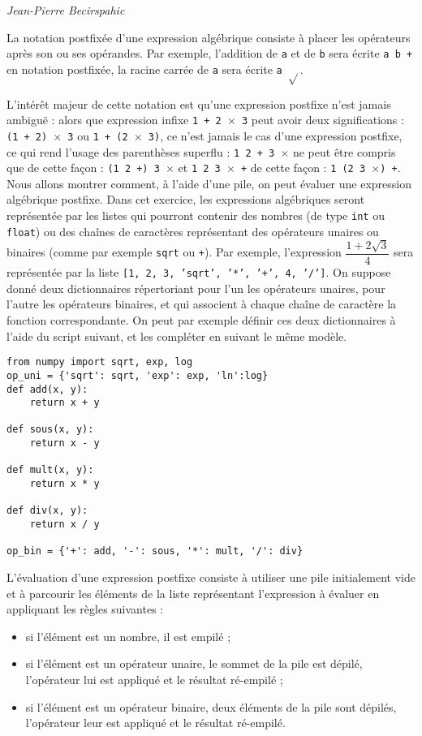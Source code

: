 
\begin{flushright}
\textit{Jean-Pierre Becirspahic}
\end{flushright}

La notation postfixée d’une expression algébrique consiste à placer les opérateurs après son ou ses opérandes. Par
exemple, l’addition de \texttt{a} et de \texttt{b} sera écrite \texttt{a b +} en notation postfixée, la racine carrée de \texttt{a} sera écrite \texttt{a
 $\sqrt{}$}.
 
L’intérêt majeur de cette notation est qu’une expression postfixe n’est jamais ambiguë : alors que expression
infixe \texttt{1 + 2 $\times$ 3} peut avoir deux significations : \texttt{(1 + 2) 
$\times$ 3} ou \texttt{1 + (2 $\times$ 3)}, ce n’est jamais le cas d’une
expression postfixe, ce qui rend l’usage des parenthèses superflu : \texttt{1 2 + 3 $\times$} ne peut être compris que de cette
façon : \texttt{(1 2 +) 3 $\times$} et \texttt{1 2 3 $\times$ +} de cette façon : \texttt{1 (2 3 $\times$) +}.
Nous allons montrer comment, à l’aide d’une pile, on peut évaluer une expression algébrique postfixe.
Dans cet exercice, les expressions algébriques seront représentée par les listes qui pourront contenir des nombres
(de type \texttt{int} ou \texttt{float}) ou des chaînes de caractères représentant des opérateurs unaires ou binaires (comme par
exemple \texttt{sqrt} ou \texttt{+}).
Par exemple, l’expression  $\dfrac{1+2\sqrt{3}}{4}$ sera représentée par la liste \texttt{[1, 2, 3, 'sqrt', '*', '+', 4, '/']}.
On suppose donné deux dictionnaires répertoriant pour l’un les opérateurs unaires, pour l’autre les opérateurs
binaires, et qui associent à chaque chaîne de caractère la fonction correspondante. On peut par exemple définir
ces deux dictionnaires à l’aide du script suivant, et les compléter en suivant le même modèle.

\begin{lstlisting}
from numpy import sqrt, exp, log
op_uni = {'sqrt': sqrt, 'exp': exp, 'ln':log}
def add(x, y):
    return x + y
    
def sous(x, y):
    return x - y
    
def mult(x, y):
    return x * y
    
def div(x, y):
    return x / y

op_bin = {'+': add, '-': sous, '*': mult, '/': div}
\end{lstlisting}


L’évaluation d’une expression postfixe consiste à utiliser une pile initialement vide et à parcourir les éléments
de la liste représentant l’expression à évaluer en appliquant les règles suivantes :
\begin{itemize}
\item si l’élément est un nombre, il est empilé ;
\item si l’élément est un opérateur unaire, le sommet de la pile est dépilé, l’opérateur lui est appliqué et le
résultat ré-empilé ;
\item si l’élément est un opérateur binaire, deux éléments de la pile sont dépilés, l’opérateur leur est appliqué
et le résultat ré-empilé.
\end{itemize}

